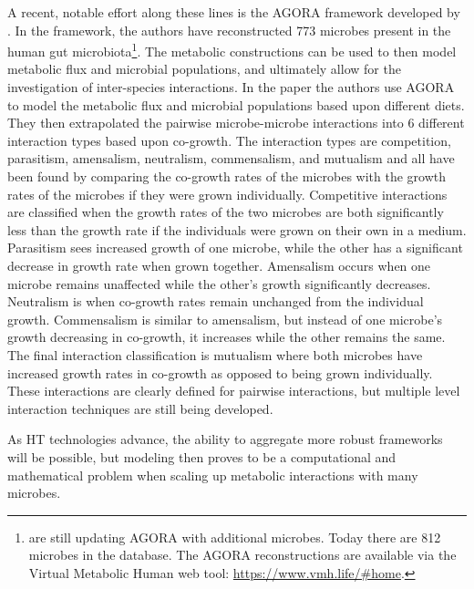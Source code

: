 A recent, notable effort along these lines is the \acrfull{AGORA} framework developed by \cite{Magnusdottir2016}. In the framework, the authors have reconstructed 773 microbes present in the human gut microbiota\footnote{\citeauthor{Magnusdottir2016} are still updating \acrshort{AGORA} with additional microbes. Today there are 812 microbes in the database. The \acrshort{AGORA} reconstructions are available via the Virtual Metabolic Human web tool: \url{https://www.vmh.life/\#home}.}. The metabolic constructions can be used to then model metabolic flux and microbial populations, and ultimately allow for the investigation of inter-species interactions. In the paper the authors use \acrshort{AGORA} to model the metabolic flux and microbial populations based upon different diets. They then extrapolated the pairwise microbe-microbe interactions into 6 different interaction types \citep{Magnusdottir2016} based upon co-growth. The interaction types are competition, parasitism, amensalism, neutralism, commensalism, and mutualism and all have been found by comparing the co-growth rates of the microbes with the growth rates of the microbes if they were grown individually. Competitive interactions are classified when the growth rates of the two microbes are both significantly less than the growth rate if the individuals were grown on their own in a medium. Parasitism sees increased growth of one microbe, while the other has a significant decrease in growth rate when grown together. Amensalism occurs when one microbe remains unaffected while the other's growth significantly decreases. Neutralism is when co-growth rates remain unchanged from the individual growth. Commensalism is similar to amensalism, but instead of one microbe's growth decreasing in co-growth, it increases while the other remains the same. The final interaction classification is mutualism where both microbes have increased growth rates in co-growth as opposed to being grown individually. These interactions are clearly defined for pairwise interactions, but multiple level interaction techniques are still being developed.

As \acrshort{HT} technologies advance, the ability to aggregate more robust frameworks will be possible, but modeling then proves to be a computational and mathematical problem when scaling up metabolic interactions with many microbes. 

